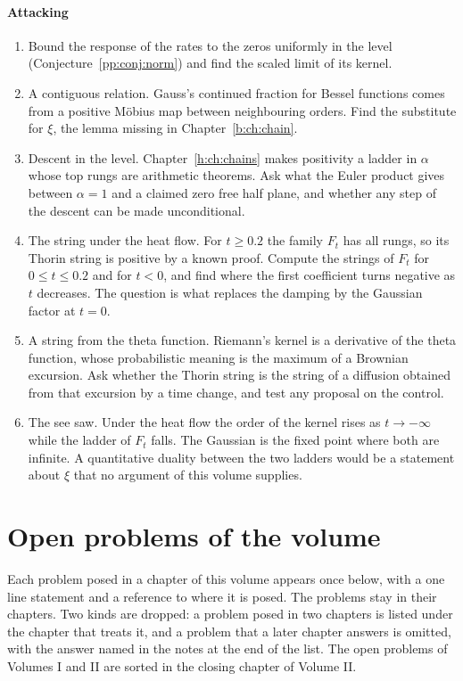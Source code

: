 \paragraph{Attacking}
\begin{enumerate}
\item Bound the response of the rates to the zeros uniformly in the level (Conjecture~\ref{pp:conj:norm}) and find the scaled limit of its kernel.
\item A contiguous relation. Gauss's continued fraction for Bessel functions comes from a positive M\"obius map between neighbouring orders. Find the substitute for $\xi$, the lemma missing in Chapter~\ref{b:ch:chain}.
\item Descent in the level. Chapter~\ref{h:ch:chains} makes positivity a ladder in $\alpha$ whose top rungs are arithmetic theorems. Ask what the Euler product gives between $\alpha=1$ and a claimed zero free half plane, and whether any step of the descent can be made unconditional.
\item The string under the heat flow. For $t\ge0.2$ the family $F_t$ has all rungs, so its Thorin string is positive by a known proof. Compute the strings of $F_t$ for $0\le t\le0.2$ and for $t<0$, and find where the first coefficient turns negative as $t$ decreases. The question is what replaces the damping by the Gaussian factor at $t=0$.
\item A string from the theta function. Riemann's kernel is a derivative of the theta function, whose probabilistic meaning is the maximum of a Brownian excursion. Ask whether the Thorin string is the string of a diffusion obtained from that excursion by a time change, and test any proposal on the control.
\item The see saw. Under the heat flow the order of the kernel rises as $t\to-\infty$ while the ladder of $F_t$ falls. The Gaussian is the fixed point where both are infinite. A quantitative duality between the two ladders would be a statement about $\xi$ that no argument of this volume supplies.
\end{enumerate}

\section{Open problems of the volume}\label{fin:sec:open}

Each problem posed in a chapter of this volume appears once below, with a one line statement and a reference to where it is posed. The problems stay in their chapters. Two kinds are dropped: a problem posed in two chapters is listed under the chapter that treats it, and a problem that a later chapter answers is omitted, with the answer named in the notes at the end of the list. The open problems of Volumes I and II are sorted in the closing chapter of Volume II.

